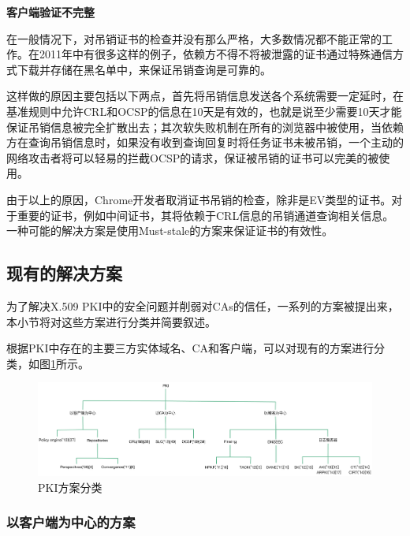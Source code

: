 \begin{itemize}
	\noindent\textbf{客户端验证不完整}

	在一般情况下，对吊销证书的检查并没有那么严格，大多数情况都不能正常的工作。在2011年中有很多这样的例子，依赖方不得不将被泄露的证书通过特殊通信方式下载并存储在黑名单中，来保证吊销查询是可靠的。

	这样做的原因主要包括以下两点，首先将吊销信息发送各个系统需要一定延时，在基准规则中允许CRL和OCSP的信息在10天是有效的，也就是说至少需要10天才能保证吊销信息被完全扩散出去；其次软失败机制在所有的浏览器中被使用，当依赖方在查询吊销信息时，如果没有收到查询回复时将任务证书未被吊销，一个主动的网络攻击者将可以轻易的拦截OCSP的请求，保证被吊销的证书可以完美的被使用。

	由于以上的原因，Chrome开发者取消证书吊销的检查，除非是EV类型的证书。对于重要的证书，例如中间证书，其将依赖于CRL信息的吊销通道查询相关信息。一种可能的解决方案是使用Must-stale的方案来保证证书的有效性。

\end{itemize}


\subsection{现有的解决方案}

为了解决X.509 PKI中的安全问题并削弱对CAs的信任，一系列的方案被提出来，本小节将对这些方案进行分类并简要叙述。



根据PKI中存在的主要三方实体域名、CA和客户端，可以对现有的方案进行分类，如图\ref{fig:Classification_of_PKI_proposals}所示。

\begin{figure}[htbp]
 	\centering
 	\includegraphics[scale=0.35, angle=90]{img/Classification_of_PKI_proposals}
 	\caption{PKI方案分类}\label{fig:Classification_of_PKI_proposals}
\end{figure}



\subsubsection{以客户端为中心的方案}

